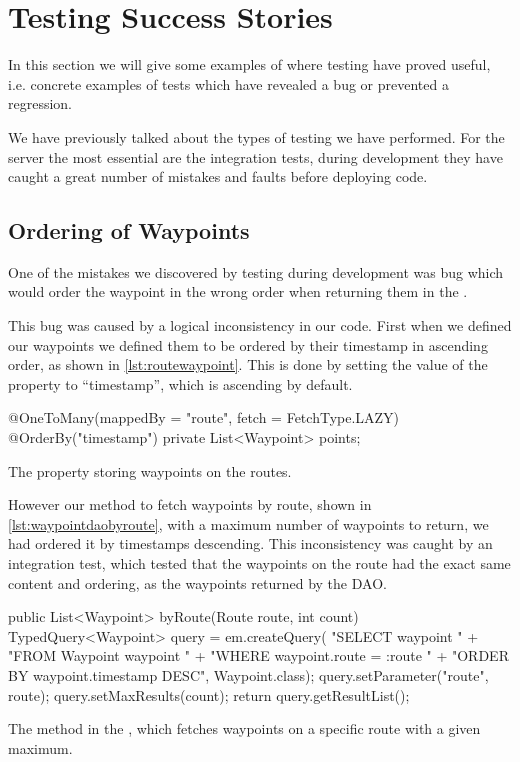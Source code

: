 \section{Testing Success Stories} %
In this section we will give some examples of where testing have proved useful,
i.e. concrete examples of tests which have revealed a bug or prevented a regression.

We have previously talked about the types of testing we have performed.
For the server the most essential are the integration tests,
during development they have caught a great number of mistakes and faults before deploying code.

\subsection{Ordering of Waypoints}
One of the mistakes we discovered by testing during development was bug which would order the waypoint in the wrong order when returning them in the .

This bug was caused by a logical inconsistency in our code.
First when we defined our waypoints we defined them to be ordered by their timestamp in ascending order, as shown in \cref{lst:routewaypoint}.
This is done by setting the value of the  property to ``timestamp'', which is ascending by default.
\begin{listing}
    \begin{java2}
@OneToMany(mappedBy = "route", fetch = FetchType.LAZY)
@OrderBy("timestamp")
private List<Waypoint> points;
    \end{java2}
    \caption{The property storing waypoints on the routes.}
    \label{lst:routewaypoint}
\end{listing}

However our method to fetch waypoints by route, shown in \cref{lst:waypointdaobyroute}, with a maximum number of waypoints to return,
we had ordered it by timestamps descending.
This inconsistency was caught by an integration test, which tested that the waypoints on the route had the exact same content and ordering, as the waypoints returned by the \ac{DAO}. 
\begin{listing}
    \begin{java2}
public List<Waypoint> byRoute(Route route, int count) {
    TypedQuery<Waypoint> query = em.createQuery(
        "SELECT waypoint " +
            "FROM Waypoint waypoint " +
            "WHERE waypoint.route = :route " +
            "ORDER BY waypoint.timestamp DESC", Waypoint.class);
    query.setParameter("route", route);
    query.setMaxResults(count);
    return query.getResultList();
}
    \end{java2}
    \caption{The method in the , which fetches waypoints on a specific route with a given maximum.}
    \label{lst:waypointdaobyroute}
\end{listing}

